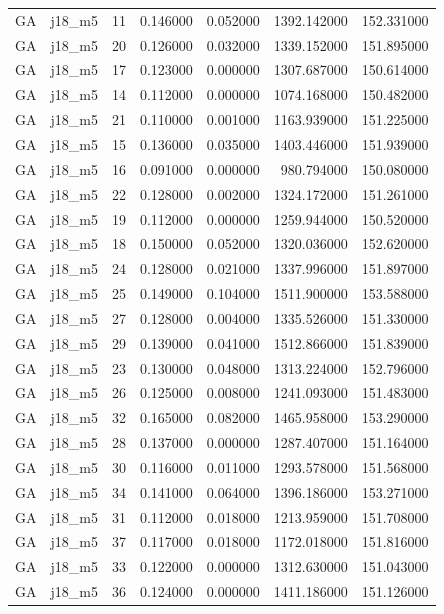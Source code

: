 \begin{tabular}{llrrrrr}
GA & j18_m5 & 11 & 0.146000 & 0.052000 & 1392.142000 & 152.331000 \\
GA & j18_m5 & 20 & 0.126000 & 0.032000 & 1339.152000 & 151.895000 \\
GA & j18_m5 & 17 & 0.123000 & 0.000000 & 1307.687000 & 150.614000 \\
GA & j18_m5 & 14 & 0.112000 & 0.000000 & 1074.168000 & 150.482000 \\
GA & j18_m5 & 21 & 0.110000 & 0.001000 & 1163.939000 & 151.225000 \\
GA & j18_m5 & 15 & 0.136000 & 0.035000 & 1403.446000 & 151.939000 \\
GA & j18_m5 & 16 & 0.091000 & 0.000000 & 980.794000 & 150.080000 \\
GA & j18_m5 & 22 & 0.128000 & 0.002000 & 1324.172000 & 151.261000 \\
GA & j18_m5 & 19 & 0.112000 & 0.000000 & 1259.944000 & 150.520000 \\
GA & j18_m5 & 18 & 0.150000 & 0.052000 & 1320.036000 & 152.620000 \\
GA & j18_m5 & 24 & 0.128000 & 0.021000 & 1337.996000 & 151.897000 \\
GA & j18_m5 & 25 & 0.149000 & 0.104000 & 1511.900000 & 153.588000 \\
GA & j18_m5 & 27 & 0.128000 & 0.004000 & 1335.526000 & 151.330000 \\
GA & j18_m5 & 29 & 0.139000 & 0.041000 & 1512.866000 & 151.839000 \\
GA & j18_m5 & 23 & 0.130000 & 0.048000 & 1313.224000 & 152.796000 \\
GA & j18_m5 & 26 & 0.125000 & 0.008000 & 1241.093000 & 151.483000 \\
GA & j18_m5 & 32 & 0.165000 & 0.082000 & 1465.958000 & 153.290000 \\
GA & j18_m5 & 28 & 0.137000 & 0.000000 & 1287.407000 & 151.164000 \\
GA & j18_m5 & 30 & 0.116000 & 0.011000 & 1293.578000 & 151.568000 \\
GA & j18_m5 & 34 & 0.141000 & 0.064000 & 1396.186000 & 153.271000 \\
GA & j18_m5 & 31 & 0.112000 & 0.018000 & 1213.959000 & 151.708000 \\
GA & j18_m5 & 37 & 0.117000 & 0.018000 & 1172.018000 & 151.816000 \\
GA & j18_m5 & 33 & 0.122000 & 0.000000 & 1312.630000 & 151.043000 \\
GA & j18_m5 & 36 & 0.124000 & 0.000000 & 1411.186000 & 151.126000 \\

\end{tabular}
